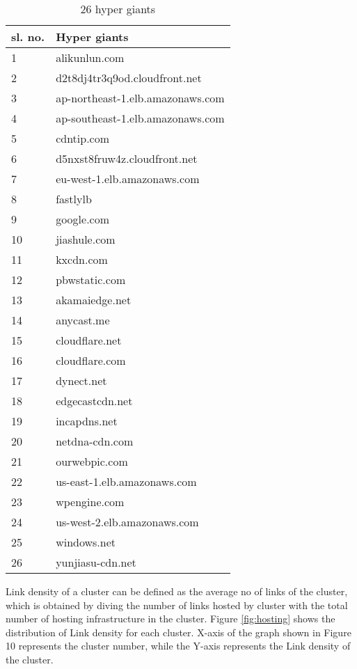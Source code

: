 \begin{table}[htb]
\centering
\begin{tabular}[t]{|p{}||p{}|}
\hline
 sl. no. &Hyper giants\\
 \hline
 1&alikunlun.com \\
2&d2t8dj4tr3q9od.cloudfront.net\\
 3&ap-northeast-1.elb.amazonaws.com\\
 4&ap-southeast-1.elb.amazonaws.com\\
 5&cdntip.com\\
 6&d5nxst8fruw4z.cloudfront.net\\
 7&eu-west-1.elb.amazonaws.com\\
 8&fastlylb\\
 9&google.com\\
 10&jiashule.com\\
 11&kxcdn.com\\
12&pbwstatic.com\\ 
 13&akamaiedge.net\\ 
 14&anycast.me\\
 15&cloudflare.net\\
 16&cloudflare.com\\ 
17&dynect.net\\
 18&edgecastcdn.net\\ 
19&incapdns.net\\
 20&netdna-cdn.com\\ 
21&ourwebpic.com\\
 22&us-east-1.elb.amazonaws.com\\ 
23&wpengine.com\\
 24&us-west-2.elb.amazonaws.com\\ 
25&windows.net\\
 26&yunjiasu-cdn.net\\ 
 \hline
\end{tabular}
\caption{26 hyper giants}
\label{tab:hypergiant}
\end{table}
\pagebreak

\noindent Link density of a cluster can be defined as the average no of links of the cluster, which is obtained by diving the number of links hosted by cluster with the total number of hosting infrastructure in the cluster. Figure \ref{fig:hosting} shows the distribution of Link density for each cluster. X-axis of the graph shown in Figure 10 represents the cluster number, while the Y-axis represents the Link density of the cluster. \\

